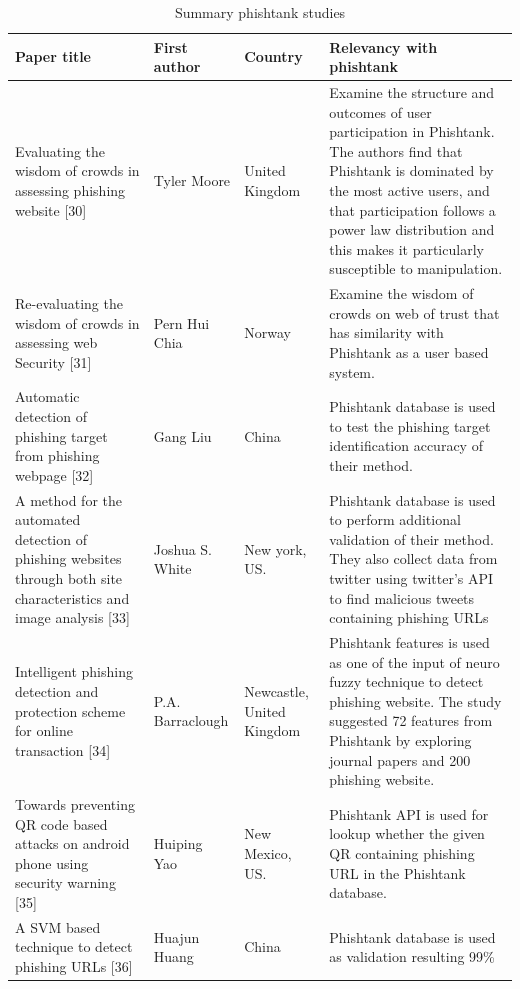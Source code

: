\begin{longtable}{>{\raggedright}p{3cm}>{\raggedright}p{2cm}>{\raggedright}p{2cm}>{\raggedright}p{5cm}}
\caption{\label{tab:phishtank}Summary phishtank studies}
\tabularnewline
\toprule 
\textbf{\footnotesize{}Paper title} & \textbf{\footnotesize{}First author} & \textbf{\footnotesize{}Country} & \textbf{\footnotesize{}Relevancy with phishtank}\tabularnewline
\midrule 
{\scriptsize{}Evaluating the wisdom of crowds in assessing phishing
website {[}30{]}} & {\scriptsize{}Tyler Moore} & {\scriptsize{}United Kingdom} & {\scriptsize{}Examine the structure and outcomes of user participation
in Phishtank. The authors find that Phishtank is dominated by the
most active users, and that participation follows a power law distribution
and this makes it particularly susceptible to manipulation.}\tabularnewline
\midrule 
{\scriptsize{}Re-evaluating the wisdom of crowds in assessing web
Security {[}31{]}} & {\scriptsize{}Pern Hui Chia} & {\scriptsize{}Norway} & {\scriptsize{}Examine the wisdom of crowds on web of trust that has
similarity with Phishtank as a user based system.}\tabularnewline
\midrule 
{\scriptsize{}Automatic detection of phishing target from phishing
webpage {[}32{]}} & {\scriptsize{}Gang Liu} & {\scriptsize{}China} & {\scriptsize{}Phishtank database is used to test the phishing target
identification accuracy of their method.}\tabularnewline
\midrule 
{\scriptsize{}A method for the automated detection of phishing websites
through both site characteristics and image analysis {[}33{]}} & {\scriptsize{}Joshua S. White} & {\scriptsize{}New york, US.} & {\scriptsize{}Phishtank database is used to perform additional validation
of their method. They also collect data from twitter using twitter\textquoteright s
API to find malicious tweets containing phishing URLs}\tabularnewline
\midrule 
{\scriptsize{}Intelligent phishing detection and protection scheme
for online transaction {[}34{]} } & {\scriptsize{}P.A. Barraclough} & {\scriptsize{}Newcastle, United Kingdom} & {\scriptsize{}Phishtank features is used as one of the input of neuro
fuzzy technique to detect phishing website. The study suggested 72
features from Phishtank by exploring journal papers and 200 phishing
website.}\tabularnewline
\midrule 
{\scriptsize{}Towards preventing QR code based attacks on android
phone using security warning {[}35{]}} & {\scriptsize{}Huiping Yao} & {\scriptsize{}New Mexico, US.} & {\scriptsize{}Phishtank API is used for lookup whether the given QR
containing phishing URL in the Phishtank database.}\tabularnewline
\midrule 
{\scriptsize{}A SVM based technique to detect phishing URLs {[}36{]}} & {\scriptsize{}Huajun Huang} & {\scriptsize{}China} & {\scriptsize{}Phishtank database is used as validation resulting 99\%
}
\end{longtable}
